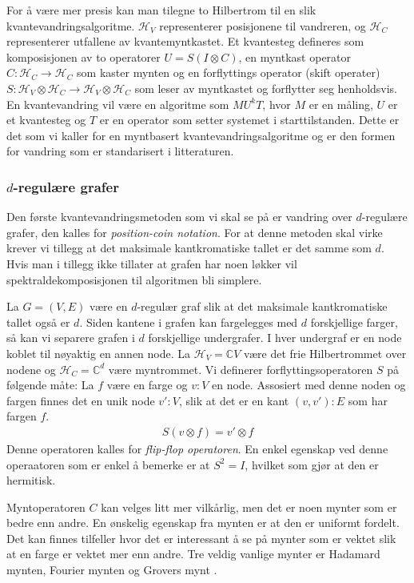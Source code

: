     For å være mer presis kan man tilegne to Hilbertrom til en slik kvantevandringsalgoritme. $\mathcal{H}_V$ representerer posisjonene til vandreren, og $\mathcal{H}_C$ representerer utfallene av kvantemyntkastet. Et kvantesteg defineres som komposisjonen av to operatorer $U=S(I\otimes C)$, en myntkast operator $C:\mathcal{H}_C\rightarrow\mathcal{H}_C$ som kaster mynten og en forflyttings operator (skift operater) $S:\mathcal{H}_V\otimes\mathcal{H}_C\rightarrow\mathcal{H}_V\otimes\mathcal{H}_C$ som leser av myntkastet og forflytter seg henholdsvis. En kvantevandring vil være en algoritme som $MU^kT$, hvor $M$ er en måling, $U$ er et kvantesteg og $T$ er en operator som setter systemet i starttilstanden. Dette er det som vi kaller for en myntbasert kvantevandringsalgoritme og er den formen for vandring som er standarisert i litteraturen.

    \subsubsection*{$d$-regulære grafer}

        Den første kvantevandringsmetoden som vi skal se på er vandring over $d$-regulære grafer, den kalles for \emph{position-coin notation}. For at denne metoden skal virke krever vi tillegg at det maksimale kantkromatiske tallet er det samme som $d$. Hvis man i tillegg ikke tillater at grafen har noen løkker vil spektraldekomposisjonen til algoritmen bli simplere.

        La $G=(V,E)$ være en $d$-regulær graf slik at det maksimale kantkromatiske tallet også er $d$. Siden kantene i grafen kan fargelegges med $d$ forskjellige farger, så kan vi separere grafen i $d$ forskjellige undergrafer. I hver undergraf er en node koblet til nøyaktig en annen node. La $\mathcal{H}_V = \mathbb{C}V$ være det frie Hilbertrommet over nodene og $\mathcal{H}_C = \mathbb{C}^d$ være myntrommet. Vi definerer forflyttingsoperatoren $S$ på følgende måte: La $f$ være en farge og $v:V$ en node. Assosiert med denne noden og fargen finnes det en unik node $v':V$, slik at det er en kant $(v,v'):E$ som har fargen $f$. 
        \begin{align*}
            S(v\otimes f)=v'\otimes f 
        \end{align*}
        Denne operatoren kalles for \emph{flip-flop operatoren}. En enkel egenskap ved denne operaatoren som er enkel å bemerke er at $S^2 = I$, hvilket som gjør at den er hermitisk. 
        
        Myntoperatoren $C$ kan velges litt mer vilkårlig, men det er noen mynter som er bedre enn andre. En ønskelig egenskap fra mynten er at den er uniformt fordelt. Det kan finnes tilfeller hvor det er interessant å se på mynter som er vektet slik at en farge er vektet mer enn andre. Tre veldig vanlige mynter er Hadamard mynten, Fourier mynten og Grovers mynt .

